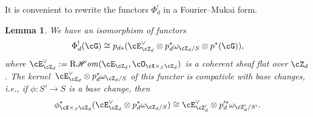 \documentclass[11pt]{amsart}
\DeclareMathOperator{\RCHom}{\mathrm{R}\mathscr{H}\mathit{om}}
\theoremstyle{plain}
\newtheorem{lemma}[theorem]{Lemma}
\theoremstyle{definition}
\theoremstyle{remark}
\begin{document}
It is convenient to rewrite the functors $\Phi_d^!$ in a Fourier--Mukai form.

\begin{lemma}
\label{lemma:phid-shriek-other}
We have an isomorphism of functors
\begin{equation*}
\Phi_d^!(\cG) \cong p_{d*}(\cE_{\cZ_d}^\vee \otimes p_d^*\omega_{\cZ_d/S} \otimes p^*(\cG)),
\end{equation*}
where $\cE_{\cZ_d}^\vee := \RCHom(\cE_{\cZ_d},\cO_{\cX \times_S \cZ_d})$ is a coherent sheaf flat over $\cZ_d$.
The kernel~$\cE_{\cZ_d}^\vee \otimes p_d^*\omega_{\cZ_d/S}$ of this functor is compativle with base changes, i.e.,
if $\phi \colon S' \to S$ is a base change, then
\begin{equation*}
\phi_{\cX \times_S \cZ_d}^*(\cE_{\cZ_d}^\vee \otimes p_d^*\omega_{\cZ_d/S}) \cong \cE_{\cZ'_d}^\vee \otimes p_d^{\prime*}\omega_{\cZ'_d/S'}.
\end{equation*}
\end{lemma}
\end{document}
